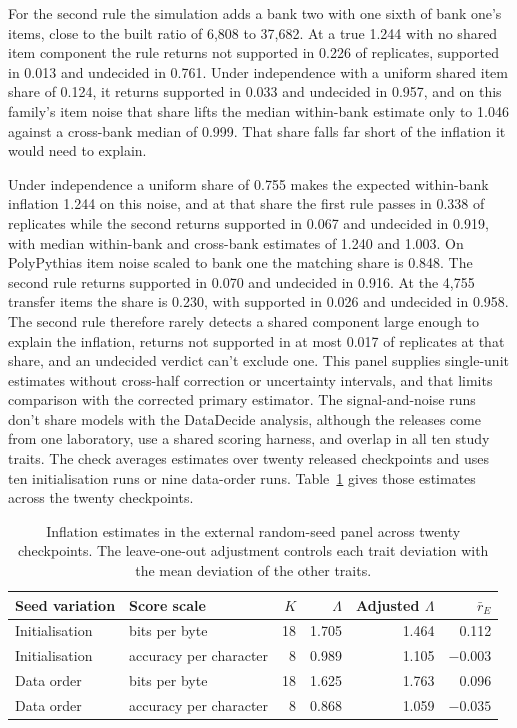 For the second rule the simulation adds a bank two with one sixth of bank one's items, close to the built ratio of 6,808 to 37,682. At a true 1.244 with no shared item component the rule returns not supported in 0.226 of replicates, supported in 0.013 and undecided in 0.761. Under independence with a uniform shared item share of 0.124, it returns supported in 0.033 and undecided in 0.957, and on this family's item noise that share lifts the median within-bank estimate only to 1.046 against a cross-bank median of 0.999. That share falls far short of the inflation it would need to explain.

Under independence a uniform share of 0.755 makes the expected within-bank inflation 1.244 on this noise, and at that share the first rule passes in 0.338 of replicates while the second returns supported in 0.067 and undecided in 0.919, with median within-bank and cross-bank estimates of 1.240 and 1.003. On PolyPythias item noise scaled to bank one the matching share is 0.848. The second rule returns supported in 0.070 and undecided in 0.916. At the 4,755 transfer items the share is 0.230, with supported in 0.026 and undecided in 0.958. The second rule therefore rarely detects a shared component large enough to explain the inflation, returns not supported in at most 0.017 of replicates at that share, and an undecided verdict can't exclude one.
This panel supplies single-unit estimates without cross-half correction or uncertainty intervals, and that limits comparison with the corrected primary estimator. The signal-and-noise runs don't share models with the DataDecide analysis, although the releases come from one laboratory, use a shared scoring harness, and overlap in all ten study traits. The check averages estimates over twenty released checkpoints and uses ten initialisation runs or nine data-order runs. Table~\ref{tab:original12} gives those estimates across the twenty checkpoints.

\begin{table}[!htb]
\centering
\caption{Inflation estimates in the external random-seed panel across twenty checkpoints. The leave-one-out adjustment controls each trait deviation with the mean deviation of the other traits.}
\label{tab:original12}
\small\setlength{\tabcolsep}{4pt}\renewcommand{\arraystretch}{1.12}
\begin{tabular}{llrrrr}\toprule
Seed variation & Score scale & $K$ & $\Lambda$ & Adjusted $\Lambda$ & $\bar r_E$\\\midrule
Initialisation & bits per byte & 18 & 1.705 & 1.464 & 0.112\\
Initialisation & accuracy per character & 8 & 0.989 & 1.105 & $-0.003$\\
Data order & bits per byte & 18 & 1.625 & 1.763 & 0.096\\
Data order & accuracy per character & 8 & 0.868 & 1.059 & $-0.035$\\\bottomrule
\end{tabular}
\end{table}

